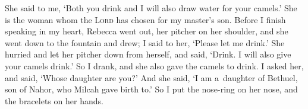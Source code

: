 \begin{inparaenum}
     She said to me, `Both you drink and I will also draw water for your camels.' She is the woman whom the \textsc{Lord} has chosen for my master's son.%
     Before I finish speaking in my heart, Rebecca went out, her pitcher on her shoulder, and she went down to the fountain and drew; I said to her, `Please let me drink.'%
     She hurried and let her pitcher down from herself, and said, `Drink. I will also give your camels drink.' So I drank, and she also gave the camels to drink.%
     I asked her, and said, `Whose daughter are you?' And she said, `I am a\understood\ daughter of Bethuel, son of Nahor, who Milcah gave birth to.' So I put the nose-ring on her nose, and the bracelets on her hands.%
    
     \smallskip%
    
    \pvdb{}{}%
    
    \pvdb{}{}%
    
\end{inparaenum}

